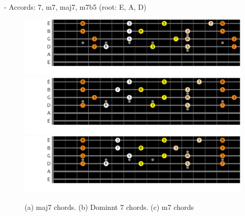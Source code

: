 \documentclass{article}
\begin{document}
- Accords: 7, m7, maj7, m7b5 (root: E, A, D)

\begin{figure}[h!]
	\centering
	\hspace*{-2.2cm}
	\includegraphics[scale=0.7, trim= {0cm 0cm 0cm 0cm}, clip]{figures/chord-inversions/maj7.pdf}
	\hspace*{-2.2cm}
	\includegraphics[scale=0.7, trim= {0cm 0cm 0cm 0cm}, clip]{figures/chord-inversions/Dominant7.pdf}
	\hspace*{-2.2cm}
	\includegraphics[scale=0.7, trim= {0cm 0cm 0cm 0cm}, clip]{figures/chord-inversions/m7.pdf}
	\caption{(a) maj7 chords. (b) Dominnt 7 chords. (c) m7 chords  }
	\label{fig}
\end{figure}

\end{document}
